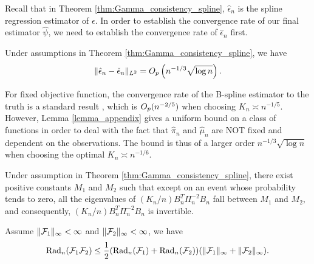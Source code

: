 Recall that in Theorem \ref{thm:Gamma_consistency_spline}, $\hat\epsilon_n$ is the spline regression estimator of $\epsilon$. In order to establish the convergence rate of our final estimator $\hat\psi$, we need to establish the convergence rate of  $\hat \epsilon_n$ first.
\begin{lemma}\label{lemma_appendix}
Under assumptions in Theorem \ref{thm:Gamma_consistency_spline}, we have
$$\|\hat \epsilon_n-\check\epsilon_n\|_{L^2}=O_p\left(n^{-1/3}\sqrt{\log n}\right).$$
\end{lemma}
\begin{remark}
For fixed objective function, the convergence rate of the B-spline estimator to the truth is a standard result \citep{huang2004polynomial, huang2003local}, which is $O_p(n^{-2/5})$ when choosing $K_n\asymp n^{-1/5}$. However, Lemma \ref{lemma_appendix} gives a uniform bound on a class of functions in order to deal with the fact that $\hat\pi_n$ and $\hat\mu_n$ are NOT fixed and dependent on the observations. The bound is thus of a larger order $n^{-1/3}\sqrt{\log n}$ when choosing the optimal $K_n\asymp n^{-1/6}$.
\end{remark}

\begin{lemma}\label{lemma:eigenvalue}
Under assumption in Theorem \ref{thm:Gamma_consistency_spline}, there exist positive constants $M_1$ and $M_2$ such that except on an event whose probability tends to zero, all the eigenvalues of $\left(K_n/n\right)B_n^T\Pi_n^{-2}B_n$ fall between $M_1$ and $M_2$, and consequently, $\left(K_n/n\right)B_n^T\Pi_n^{-2}B_n$ is invertible.
\end{lemma}

\begin{lemma}\label{lemma:complexity}
Assume $\|\mathcal{F}_1\|_{\infty}<\infty$ and $\|\mathcal{F}_2\|_{
\infty}<\infty$, we have
$$
\text{Rad}_n(\mathcal{F}_1\mathcal{F}_2)
\leq 
\frac{1}{2}(\text{Rad}_n(\mathcal{F}_1)+\text{Rad}_n(\mathcal{F}_2))(\|\mathcal{F}_1\|_{\infty}+\|\mathcal{F}_2\|_{\infty}).
$$
\end{lemma}

